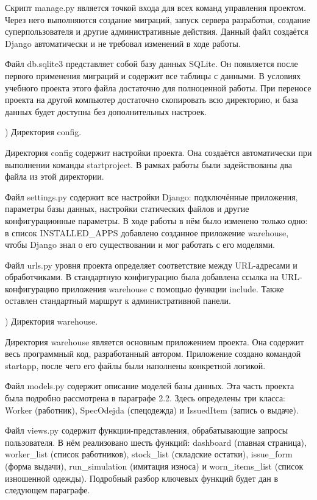 \documentclass[14pt,a4paper]{extreport}
\begin{document}
\begin{singlespacing}
Скрипт manage.py является точкой входа для всех команд управления проектом. Через него выполняются создание миграций, запуск сервера разработки, создание суперпользователя и другие административные действия. Данный файл создаётся Django автоматически и не требовал изменений в ходе работы.

Файл db.sqlite3 представляет собой базу данных SQLite. Он появляется после первого применения миграций и содержит все таблицы с данными. В условиях учебного проекта этого файла достаточно для полноценной работы. При переносе проекта на другой компьютер достаточно скопировать всю директорию, и база данных будет доступна без дополнительных настроек.

) Директория config.

Директория config содержит настройки проекта. Она создаётся автоматически при выполнении команды startproject. В рамках работы были задействованы два файла из этой директории.

Файл settings.py содержит все настройки Django: подключённые приложения, параметры базы данных, настройки статических файлов и другие конфигурационные параметры. В ходе работы в нём было изменено только одно: в список INSTALLED\_APPS добавлено созданное приложение warehouse, чтобы Django знал о его существовании и мог работать с его моделями.

Файл urls.py уровня проекта определяет соответствие между URL-адресами и обработчиками. В стандартную конфигурацию была добавлена ссылка на URL-конфигурацию приложения warehouse с помощью функции include. Также оставлен стандартный маршрут к административной панели.

) Директория warehouse.

Директория warehouse является основным приложением проекта. Она содержит весь программный код, разработанный автором. Приложение создано командой startapp, после чего его файлы были наполнены конкретной логикой.

Файл models.py содержит описание моделей базы данных. Эта часть проекта была подробно рассмотрена в параграфе 2.2. Здесь определены три класса: Worker (работник), SpecOdejda (спецодежда) и IssuedItem (запись о выдаче).

Файл views.py содержит функции-представления, обрабатывающие запросы пользователя. В нём реализовано шесть функций: dashboard (главная страница), worker\_list (список работников), stock\_list (складские остатки), issue\_form (форма выдачи), run\_simulation (имитация износа) и worn\_items\_list (список изношенной одежды). Подробный разбор ключевых функций будет дан в следующем параграфе.


\end{singlespacing}
\end{document}

